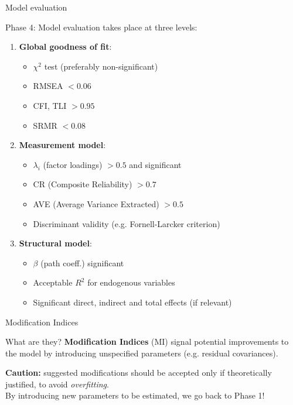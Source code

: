 \documentclass{beamer}
\begin{document}
\begin{frame}{Model evaluation}
    \begin{block}{Phase 4:}
        Model evaluation takes place at three levels:
        \begin{enumerate}
            \item \textbf{Global goodness of fit}:
            \begin{itemize}
                \item $\chi^2$ test (preferably non-significant)
                \item RMSEA $< 0.06$
                \item CFI, TLI $> 0.95$
                \item SRMR $< 0.08$
            \end{itemize}
            \item \textbf{Measurement model}:
            \begin{itemize}
                \item $\lambda_i$ (factor loadings) $> 0.5$ and significant
                \item CR (Composite Reliability) $> 0.7$
                \item AVE (Average Variance Extracted) $> 0.5$
                \item Discriminant validity (e.g. Fornell-Larcker criterion)
            \end{itemize}
            \item \textbf{Structural model}:
            \begin{itemize}
                \item $\beta$ (path coeff.) significant
                \item Acceptable $R^2$ for endogenous variables
                \item Significant direct, indirect and total effects (if relevant)
            \end{itemize}
        \end{enumerate}
    \end{block}
\end{frame}

\begin{frame}{Modification Indices}
    \begin{block}{What are they?}
        \textbf{Modification Indices} (MI) signal potential improvements to the model by introducing unspecified parameters (e.g. residual covariances).
    \end{block}
    \vspace{1em}
    \textbf{Caution:} suggested modifications should be accepted only if theoretically justified, to avoid \textit{overfitting}.\\
    \vspace{1em}
    By introducing new parameters to be estimated, we go back to Phase 1!
\end{frame}
\end{document}
